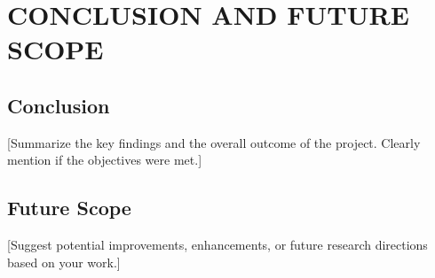 \chapter{CONCLUSION AND FUTURE SCOPE}
\label{chap:conclusion}

\section{Conclusion}
[Summarize the key findings and the overall outcome of the project. Clearly mention if the objectives were met.]

\section{Future Scope}
[Suggest potential improvements, enhancements, or future research directions based on your work.]

